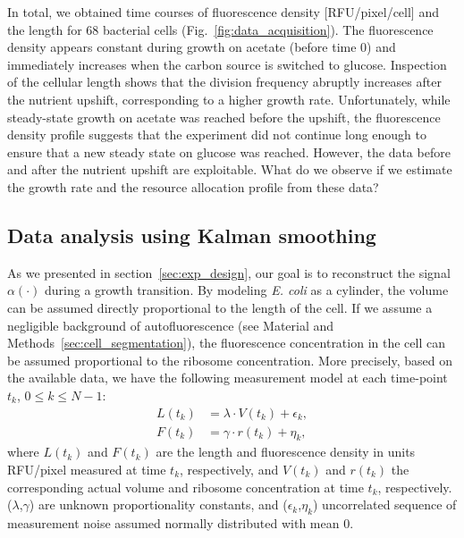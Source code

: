 In total, we obtained time courses of fluorescence density [RFU/pixel/cell] and the length for 68 bacterial cells (Fig.~\ref{fig:data_acquisition}).
The fluorescence density appears constant during growth on acetate (before time 0) and immediately increases when the carbon source is switched to glucose.
Inspection of the cellular length shows that the division frequency abruptly increases after the nutrient upshift, corresponding to a higher growth rate.
Unfortunately, while steady-state growth on acetate was reached before the upshift, the fluorescence density profile suggests that the experiment did not continue long enough to ensure that a new steady state on glucose was reached.
However, the data before and after the nutrient upshift are exploitable.
What do we observe if we estimate the growth rate and the resource allocation profile from these data?

\subsection{Data analysis using Kalman smoothing}
\label{sec:res_kalman}

As we presented in section~\ref{sec:exp_design}, our goal is to reconstruct the signal $\alpha (\cdot)$ during a growth transition.
By modeling \textit{E. coli} as a cylinder, the volume can be assumed directly proportional to the length of the cell.
If we assume a negligible background of autofluorescence (see Material and Methods~\ref{sec:cell_segmentation}), the fluorescence concentration in the cell can be assumed proportional to the ribosome concentration.
More precisely, based on the available data, we have the following measurement model at each time-point $t_k$, $0\leq k \leq N-1$:
\begin{eqnarray}
L(t_k) &= \lambda \cdot V(t_k) + \epsilon_k, \label{eq:mes_L}\\
F(t_k) &= \gamma \cdot r(t_k) + \eta_k, \label{eq:mes_F}
\end{eqnarray}
where $L(t_k)$ and $F(t_k)$ are the length and fluorescence density in units RFU/pixel measured at time $t_k$, respectively,  and $V(t_k)$  and $r(t_k)$ the corresponding actual volume and ribosome concentration at time $t_k$, respectively. ($\lambda$,$\gamma$) are unknown proportionality constants, and ($\epsilon_k$,$\eta_k$) uncorrelated sequence of measurement noise assumed normally distributed with mean 0.

